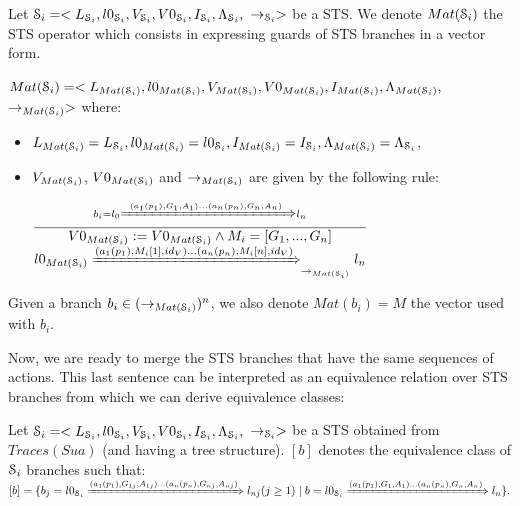 \begin{definition}
\label{rule:matrix}
  Let $\EuScript{S}_i=<L_{\EuScript{S}_i},l0_{\EuScript{S}_i},V_{\EuScript{S}_i},V0_{\EuScript{S}_i},I_{\EuScript{S}_i},\Lambda_{\EuScript{S}_i},$
  $\rightarrow_{\EuScript{S}_i}>$ be a STS. We denote
  $Mat(\EuScript{S}_i)$ the STS operator which consists in
  expressing guards of STS branches in a vector form.

  $Mat(\EuScript{S}_i)=<L_{Mat(\EuScript{S}_i)},l0_{Mat(\EuScript{S}_i)},V_{Mat(\EuScript{S}_i)},V0_{Mat(\EuScript{S}_i)},I_{Mat(\EuScript{S}_i)},\Lambda_{Mat(\EuScript{S}_i)},$
  $\rightarrow_{Mat(\EuScript{S}_i)}>$ where:

	\begin{itemize}
    \item $L_{Mat(\EuScript{S}_i)}=L_{\EuScript{S}_i}, l0_{Mat(\EuScript{S}_i)}=l0_{\EuScript{S}_i}, I_{Mat(\EuScript{S}_i)}=I_{\EuScript{S}_i},\Lambda_{Mat(\EuScript{S}_i)} = \Lambda_{\EuScript{S}_i}$,

    \item $V_{Mat(\EuScript{S}_i)}$, $V0_{Mat(\EuScript{S}_i)}$
      and $\rightarrow_{Mat(\EuScript{S}_i)}$ are given by the
      following rule:

    \begin{center}
    $\frac{b_i=l_0 \xRightarrow{(a_1(p_1),G_1,A_1)...(a_n(p_n),G_n,A_n)} l_n}{
      \begin{matrix}
        V0_{Mat(\EuScript{S}_i)}:=V0_{Mat(\EuScript{S}_i)} \wedge M_{i}=[G_1,...,G_n]\\
        l0_{Mat(\EuScript{S}_i)} \xRightarrow{(a_1(p_1),M_i[1],id_V) ...(a_n(p_n),M_i[n],id_V) }_{\rightarrow_{Mat(\EuScript{S}_i)}} l_n\\
      \end{matrix}
    }$
    \end{center}
  \end{itemize}

  Given a branch $b_i \in (\rightarrow_{Mat(\EuScript{S}_i)})^n$, we also denote
  $Mat(b_i)=M$ the vector used with $b_i$.
\end{definition}

Now, we are ready to merge the STS branches that have the same
sequences of actions. This last sentence can be interpreted as an
equivalence relation over STS branches from which we can derive
equivalence classes:

\begin{definition}
Let
$\EuScript{S}_i=<L_{\EuScript{S}_i},l0_{\EuScript{S}_i},V_{\EuScript{S}_i},V0_{\EuScript{S}_i},I_{\EuScript{S}_i},\Lambda_{\EuScript{S}_i},$
$\rightarrow_{\EuScript{S}_i}>$ be a STS obtained from
$Traces(Sua)$ (and having a tree structure). $[b]$ denotes the
equivalence class of $\EuScript{S}_i$ branches such that: $[b]=\{
b_j= l0_{\EuScript{S}_i}\\
\xRightarrow{(a_1(p_1),G_{1j},A_{1j})\dots(a_n(p_n),G_{nj},A_{nj})}
l_{nj}(j\geq 1) \mid b=l0_{\EuScript{S}_i}
\xRightarrow{(a_1(p_1),G_{1},A_{1})\dots(a_n(p_n),G_{n},A_{n})}
l_n\}.$
\end{definition}

